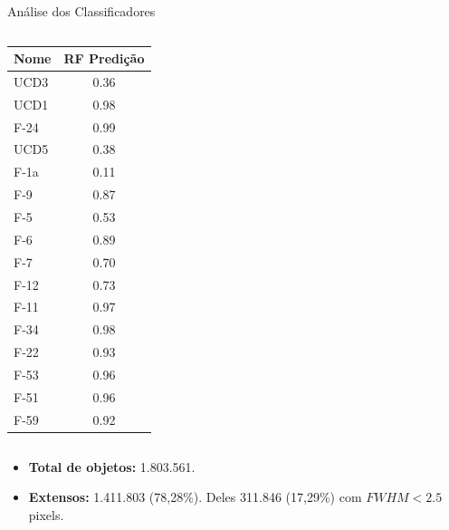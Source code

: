 \begin{frame}[c]{Análise dos Classificadores}
\begin{columns}[c]
        \begin{column}{0.2\textwidth} %
            \tiny
            \begin{table}[H]
                \centering
                \begin{tabular}{lc}
                    \toprule
                    Nome & RF Predição \\
                    \midrule
                    UCD3 & 0.36 \\
                    UCD1 & 0.98 \\
                    F-24 & 0.99 \\
                    UCD5 & 0.38 \\
                    F-1a & 0.11 \\
                    F-9 & 0.87 \\
                    F-5 & 0.53 \\
                    F-6 & 0.89 \\
                    F-7 & 0.70 \\
                    F-12 & 0.73 \\
                    F-11 & 0.97 \\
                    F-34 & 0.98 \\
                    F-22 & 0.93 \\
                    F-53 & 0.96 \\
                    F-51 & 0.96 \\
                    F-59 & 0.92 \\
                    \bottomrule
                \end{tabular}
            \end{table}
        \end{column}
    \end{columns}
        \begin{splusbox}{\scriptsize}
            \scriptsize
            \begin{itemize}
                \item \textbf{Total de objetos:} 1.803.561.
                \item \textbf{Extensos:} 1.411.803 (78,28\%). Deles 311.846 (17,29\%) com $FWHM < 2.5$ pixels.
            \end{itemize}
        \end{splusbox}
\end{frame}

